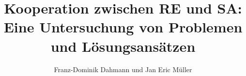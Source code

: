 \documentclass[11pt]{beamer}
\author[]{Franz-Dominik Dahmann und Jan Eric M\"uller}
\title[Kooperation zwischen RE und SA]{Kooperation zwischen RE und SA: \\Eine Untersuchung von Problemen und L\"osungsans\"atzen}
\institute{Hochschule Bonn-Rhein-Sieg}
\begin{document}
\begin{frame}
\titlepage
\end{frame}

\begin{frame}
\tableofcontents
\end{frame}






\end{document}
